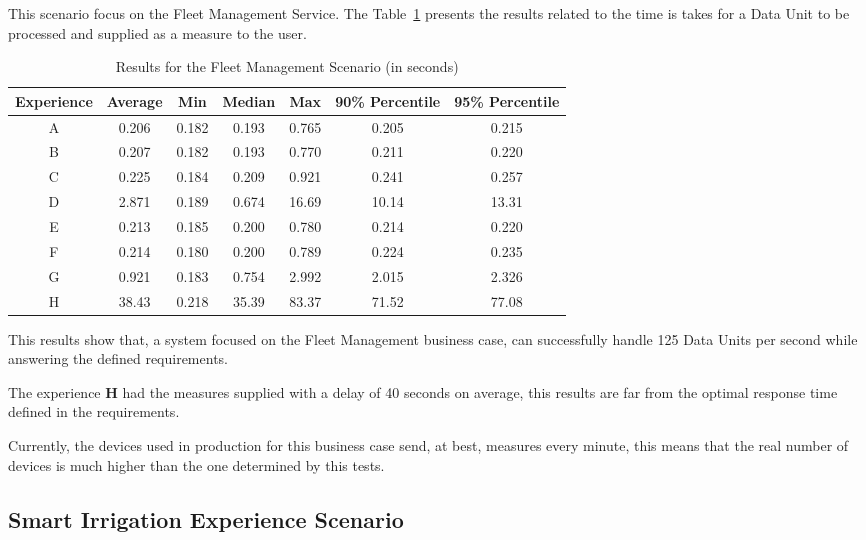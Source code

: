 This scenario focus on the Fleet Management Service. The Table~\ref{tab:evaluation:experiences:fleet:results} presents the results related to the time is takes for a Data Unit to be processed and supplied as a measure to the user.

\begin{table}[H]
    \caption{Results for the Fleet Management Scenario (in seconds)}
    \label{tab:evaluation:experiences:fleet:results}
    \centering
    \begin{tabular}{@{}ccccccc@{}}
    \toprule
    \textbf{Experience} & \textbf{Average} & \textbf{Min} & \textbf{Median} & \textbf{Max} & \textbf{90\% Percentile} & \textbf{95\% Percentile} \\ \midrule
    A & 0.206 & 0.182 & 0.193 & 0.765 & 0.205 & 0.215 \\ \midrule
    B & 0.207 & 0.182 & 0.193 & 0.770 & 0.211 & 0.220 \\ \midrule
    C & 0.225 & 0.184 & 0.209 & 0.921 & 0.241 & 0.257 \\ \midrule
    D & 2.871 & 0.189 & 0.674 & 16.69 & 10.14 & 13.31 \\ \midrule
    E & 0.213 & 0.185 & 0.200 & 0.780 & 0.214 & 0.220 \\ \midrule
    F & 0.214 & 0.180 & 0.200 & 0.789 & 0.224 & 0.235 \\ \midrule
    G & 0.921 & 0.183 & 0.754 & 2.992 & 2.015 & 2.326 \\ \midrule
    H & 38.43 & 0.218 & 35.39 & 83.37 & 71.52 & 77.08 \\ \bottomrule
    \end{tabular}
\end{table}

This results show that, a system focused on the Fleet Management business case, can successfully handle 125 Data Units per second while answering the defined requirements. 

The experience \textbf{H} had the measures supplied with a delay of 40 seconds on average, this results are far from the optimal response time defined in the requirements.

Currently, the devices used in production for this business case send, at best, measures every minute, this means that the real number of devices is much higher than the one determined by this tests.

\subsection{Smart Irrigation Experience Scenario}
\label{subsec:evaluation:experiences:irrigation}


